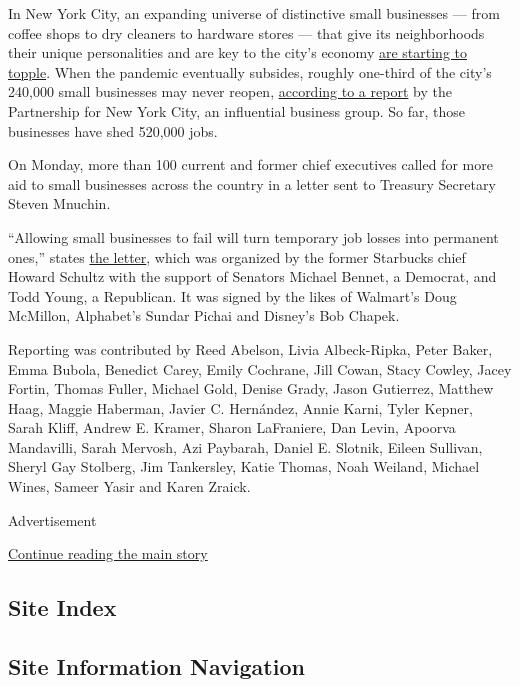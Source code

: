 In New York City, an expanding universe of distinctive small businesses
--- from coffee shops to dry cleaners to hardware stores --- that give
its neighborhoods their unique personalities and are key to the city's
economy
\href{https://www.nytimes3xbfgragh.onion/2020/08/03/nyregion/nyc-small-businesses-closing-coronavirus.html}{are
starting to topple}. When the pandemic eventually subsides, roughly
one-third of the city's 240,000 small businesses may never reopen,
\href{https://pfnyc.org/wp-content/uploads/2020/07/actionandcollaboration.pdf}{according
to a report} by the Partnership for New York City, an influential
business group. So far, those businesses have shed 520,000 jobs.

On Monday, more than 100 current and former chief executives called for
more aid to small businesses across the country in a letter sent to
Treasury Secretary Steven Mnuchin.

``Allowing small businesses to fail will turn temporary job losses into
permanent ones,'' states
\href{https://www.howardschultz.com/lettertocongress/}{the letter},
which was organized by the former Starbucks chief Howard Schultz with
the support of Senators Michael Bennet, a Democrat, and Todd Young, a
Republican. It was signed by the likes of Walmart's Doug McMillon,
Alphabet's Sundar Pichai and Disney's Bob Chapek.

Reporting was contributed by Reed Abelson, Livia Albeck-Ripka, Peter
Baker, Emma Bubola, Benedict Carey, Emily Cochrane, Jill Cowan, Stacy
Cowley, Jacey Fortin, Thomas Fuller, Michael Gold, Denise Grady, Jason
Gutierrez, Matthew Haag, Maggie Haberman, Javier C. Hernández, Annie
Karni, Tyler Kepner, Sarah Kliff, Andrew E. Kramer, Sharon LaFraniere,
Dan Levin, Apoorva Mandavilli, Sarah Mervosh, Azi Paybarah, Daniel E.
Slotnik, Eileen Sullivan, Sheryl Gay Stolberg, Jim Tankersley, Katie
Thomas, Noah Weiland, Michael Wines, Sameer Yasir and Karen Zraick.

Advertisement

\protect\hyperlink{after-bottom}{Continue reading the main story}

\hypertarget{site-index}{%
\subsection{Site Index}\label{site-index}}

\hypertarget{site-information-navigation}{%
\subsection{Site Information
Navigation}\label{site-information-navigation}}

